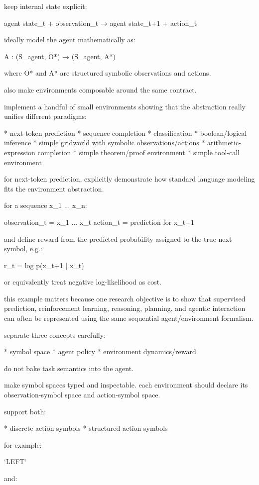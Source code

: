 keep internal state explicit:

agent state_t + observation_t
→ agent state_{t+1} + action_t

ideally model the agent mathematically as:

A : (S_agent, O*) → (S_agent, A*)

where O* and A* are structured symbolic observations and actions.

also make environments composable around the same contract.

implement a handful of small environments showing that the abstraction really unifies different paradigms:

* next-token prediction
* sequence completion
* classification
* boolean/logical inference
* simple gridworld with symbolic observations/actions
* arithmetic-expression completion
* simple theorem/proof environment
* simple tool-call environment

for next-token prediction, explicitly demonstrate how standard language modeling fits the environment abstraction.

for a sequence x_1 ... x_n:

observation_t = x_1 ... x_t
action_t = prediction for x_{t+1}

and define reward from the predicted probability assigned to the true next symbol, e.g.:

r_t = log p(x_{t+1} | x_{\le t})

or equivalently treat negative log-likelihood as cost.

this example matters because one research objective is to show that supervised prediction, reinforcement learning, reasoning, planning, and agentic interaction can often be represented using the same sequential agent/environment formalism.

separate three concepts carefully:

* symbol space
* agent policy
* environment dynamics/reward

do not bake task semantics into the agent.

make symbol spaces typed and inspectable. each environment should declare its observation-symbol space and action-symbol space.

support both:

* discrete action symbols
* structured action symbols

for example:

`LEFT`

and:

